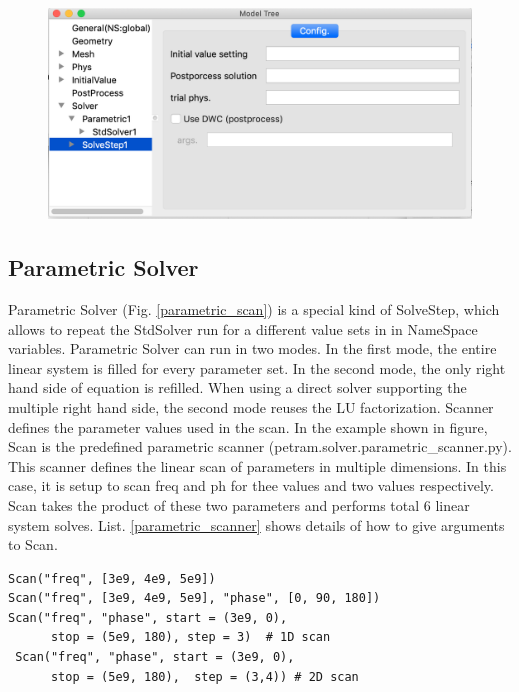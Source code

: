 \documentclass[11pt,a4paper,final]{report}
\begin{document}
\begin{figure}
\centering
\includegraphics[width=0.95\columnwidth]{figures/solve_step.png} 
\caption{  }\label{solve_step}
\end{figure}


\subsection{Parametric Solver}
Parametric Solver (Fig. \ref{parametric_scan}) is a special kind of SolveStep, which allows to repeat the StdSolver run for a different value sets in   in NameSpace variables. 
Parametric Solver can run in two modes. In the first mode, the entire linear system is filled for every parameter set.
In the second mode, the only right hand side of equation is refilled. When using a direct solver supporting the multiple
right hand side, the second mode reuses the LU factorization. 
Scanner defines the parameter values used in the scan.  In the example shown in figure, Scan is the predefined parametric scanner (petram.solver.parametric\_scanner.py). 
This scanner defines the linear scan of parameters in multiple dimensions. 
In this case, it is setup to scan freq and ph for thee values and two values respectively. 
Scan takes the product of these two parameters and performs total 6 linear system solves.
List. \ref{parametric_scanner} shows details of how to give arguments to Scan.

\begin{minipage}[c]{0.95\textwidth}
\begin{lstlisting}[caption={Parametric Scanner},captionpos=b, frame=single, label={parametric_scanner}]
Scan("freq", [3e9, 4e9, 5e9])
Scan("freq", [3e9, 4e9, 5e9], "phase", [0, 90, 180])
Scan("freq", "phase", start = (3e9, 0), 
      stop = (5e9, 180), step = 3)  # 1D scan 
 Scan("freq", "phase", start = (3e9, 0), 
      stop = (5e9, 180),  step = (3,4)) # 2D scan 
\end{lstlisting}
\end{minipage}
\end{document}
